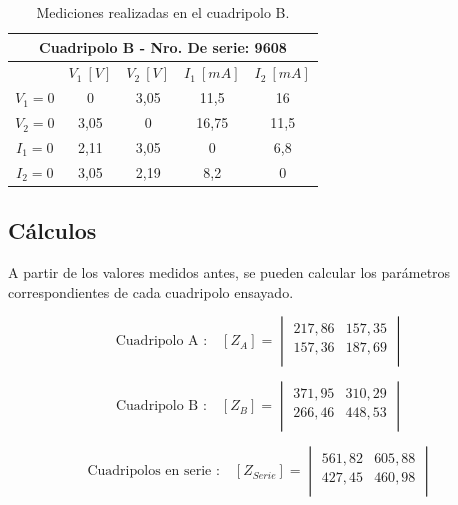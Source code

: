 \documentclass[a4paper]{article}
\begin{document}
\begin{table}[H]
\begin{center}
\begin{tabular}{|c|c|c|c|c|}
\hline
\multicolumn{5}{|c|}{Cuadripolo B - Nro. De serie: 9608} \\ \hline
 & $V_1 \ [V]$ & $V_2 \ [V]$ & $I_1 \ [mA]$ & $I_2 \ [mA]$ \\ \hline
$V_1 = 0$ & 0 & 3,05 & 11,5 & 16 \\ \hline
$V_2 = 0$ & 3,05 & 0 & 16,75 & 11,5 \\ \hline
$I_1 = 0$ & 2,11 & 3,05 & 0 & 6,8 \\ \hline
$I_2 = 0$ & 3,05 & 2,19 & 8,2 & 0 \\ \hline
\end{tabular}
\caption{Mediciones realizadas en el cuadripolo B.}
\end{center}
\end{table}

\subsection*{Cálculos}

A partir de los valores medidos antes, se pueden calcular los parámetros correspondientes de cada cuadripolo ensayado.

\begin{equation}
\text{Cuadripolo A :}\quad [Z_{A}] =
\begin{vmatrix}
	217,86 & 157,35\\
	157,36 & 187,69\\
\end{vmatrix}
\end{equation}

\begin{equation}
\text{Cuadripolo B :}\quad [Z_{B}] =
\begin{vmatrix}
	371,95 & 310,29\\
	266,46 & 448,53\\
\end{vmatrix}
\end{equation}

\begin{equation}
\text{Cuadripolos en serie :}\quad [Z_{Serie}] =
\begin{vmatrix}
	561,82 & 605,88\\
	427,45 & 460,98\\
\end{vmatrix}
\end{equation}
\end{document}
